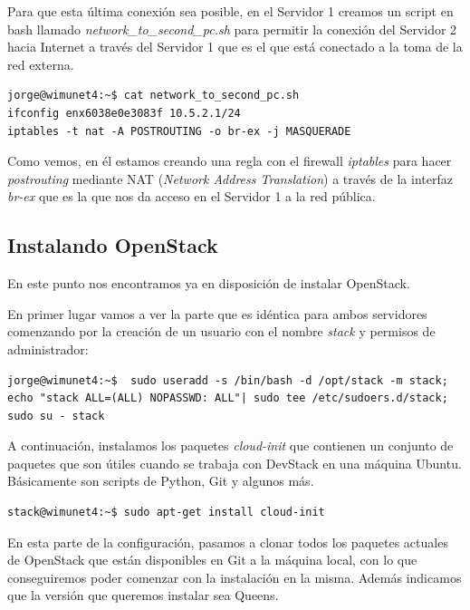 Para que esta última conexión sea posible, en el Servidor 1 creamos un script en bash llamado \textit{network\_to\_second\_pc.sh} para permitir la conexión del Servidor 2 hacia Internet a través del Servidor 1 que es el que está conectado a la toma de la red externa.

\begin{lstlisting}[style=Consola]
jorge@wimunet4:~$ cat network_to_second_pc.sh
ifconfig enx6038e0e3083f 10.5.2.1/24
iptables -t nat -A POSTROUTING -o br-ex -j MASQUERADE
\end{lstlisting}

Como vemos, en él estamos creando una regla con el firewall \textit{iptables} para hacer \textit{postrouting} mediante NAT (\textit{Network Address Translation}) a través de la interfaz \textit{br-ex} que es la que nos da acceso en el Servidor 1 a la red pública.

\subsection{Instalando OpenStack}\label{sec:instalacion}
En este punto nos encontramos ya en disposición de instalar OpenStack. 

En primer lugar vamos a ver la parte que es idéntica para ambos servidores comenzando por la creación de un usuario con el nombre \textit{stack} y permisos de administrador:

\begin{lstlisting}[style=Consola]
jorge@wimunet4:~$  sudo useradd -s /bin/bash -d /opt/stack -m stack; echo "stack ALL=(ALL) NOPASSWD: ALL"| sudo tee /etc/sudoers.d/stack; sudo su - stack
\end{lstlisting}

A continuación, instalamos los paquetes \textit{cloud-init} que contienen un  conjunto de paquetes que son útiles cuando se trabaja con DevStack en una máquina Ubuntu. Básicamente son scripts de Python, Git y algunos más.

\begin{lstlisting}[style=Consola]
stack@wimunet4:~$ sudo apt-get install cloud-init
\end{lstlisting}

En esta parte de la configuración, pasamos a clonar todos los paquetes actuales de OpenStack  que están disponibles en Git \cite{noauthor_devstack:_2018} a la máquina local, con lo que conseguiremos poder comenzar con la instalación en la misma. Además indicamos que la versión que queremos instalar sea Queens.

